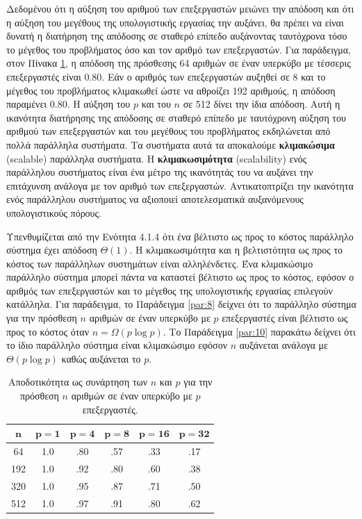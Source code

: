 \documentclass[12pt,a4paper]{article} %
\begin{document}
Δεδομένου ότι η αύξηση του αριθμού των επεξεργαστών μειώνει την απόδοση 
και ότι η αύξηση του μεγέθους της υπολογιστικής εργασίας την αυξάνει, θα 
πρέπει να είναι δυνατή η διατήρηση της απόδοσης σε σταθερό επίπεδο 
αυξάνοντας ταυτόχρονα τόσο το μέγεθος του προβλήματος όσο και τον αριθμό 
των επεξεργαστών. Για παράδειγμα, στον Πίνακα \ref{tab:table41}, η 
απόδοση της πρόσθεσης 64 αριθμών σε έναν υπερκύβο με τέσσερις
επεξεργαστές είναι 0.80. Εάν ο αριθμός των επεξεργαστών αυξηθεί σε 8 και 
το μέγεθος του προβλήματος κλιμακωθεί ώστε να αθροίζει 192 αριθμούς, η 
απόδοση παραμένει 0.80. Η αύξηση του $p$ και του $n$ σε 512 δίνει την 
ίδια απόδοση. Αυτή η ικανότητα διατήρησης της απόδοσης σε σταθερό επίπεδο 
με ταυτόχρονη αύξηση του αριθμού των επεξεργαστών και του μεγέθους του 
προβλήματος εκδηλώνεται από πολλά παράλληλα συστήματα. Τα συστήματα αυτά 
τα αποκαλούμε \textbf{κλιμακώσιμα} (scalable) 
παράλληλα συστήματα. Η \textbf{κλιμακωσιμότητα} (scalability)
ενός παράλληλου συστήματος είναι ένα μέτρο της ικανότητάς του να αυξάνει 
την επιτάχυνση ανάλογα με τον αριθμό των επεξεργαστών. Αντικατοπτρίζει 
την ικανότητα ενός παράλληλου συστήματος να αξιοποιεί αποτελεσματικά 
αυξανόμενους υπολογιστικούς πόρους.

Υπενθυμίζεται από την Ενότητα 4.1.4 ότι ένα βέλτιστο ως προς το κόστος 
παράλληλο σύστημα έχει απόδοση $\Theta(1)$. Η κλιμακωσιμότητα και η 
βελτιστότητα ως προς το κόστος των παράλληλων συστημάτων είναι αλληλένδετες. 
Ένα κλιμακώσιμο παράλληλο σύστημα μπορεί πάντα να καταστεί βέλτιστο ως 
προς το κόστος, εφόσον ο αριθμός των επεξεργαστών και το μέγεθος της
υπολογιστικής εργασίας επιλεγούν κατάλληλα. Για παράδειγμα, το Παράδειγμα 
\ref{par:8} δείχνει ότι το παράλληλο σύστημα για την πρόσθεση $n$ αριθμών 
σε έναν υπερκύβο με $p$ επεξεργαστές είναι βέλτιστο ως προς το κόστος 
όταν $n = \Omega(p \log p)$. Το Παράδειγμα \ref{par:10} παρακάτω δείχνει 
ότι το ίδιο παράλληλο σύστημα είναι κλιμακώσιμο εφόσον $n$ αυξάνεται ανάλογα 
με $\Theta(p \log p)$ καθώς αυξάνεται το $p$.

\begin{table}[H]
\centering
\caption{Αποδοτικότητα ως συνάρτηση των $n$ και $p$ για την πρόσθεση $n$ 
αριθμών σε έναν υπερκύβο με $p$ επεξεργαστές.}
\label{tab:table41}
\vspace{0.2cm} %

\begin{tabular}{cccccc}
\toprule
$\mathbf{n}$ & $\mathbf{p = 1}$ & $\mathbf{p = 4}$ & $\mathbf{p = 8}$ & $\mathbf{p = 16}$ & $\mathbf{p = 32}$ \\
\midrule
64  & 1.0 & .80 & .57 & .33 & .17 \\
192 & 1.0 & .92 & .80 & .60 & .38 \\
320 & 1.0 & .95 & .87 & .71 & .50 \\
512 & 1.0 & .97 & .91 & .80 & .62 \\
\bottomrule
\end{tabular}
\end{table}
\end{document}
